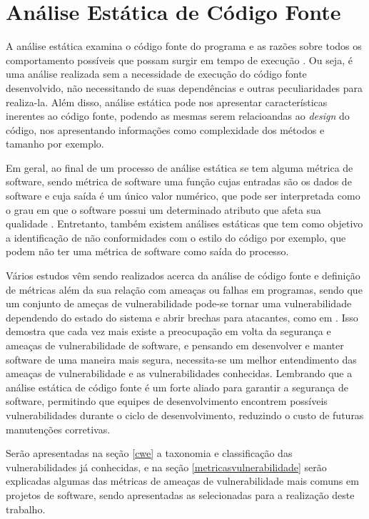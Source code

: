 \chapter{Análise Estática de Código Fonte} \label{chap:analiseestatica}

A análise estática examina o código fonte do programa e as razões sobre todos os
comportamento possíveis que possam surgir em tempo de execução
\cite{ernst:2005}. Ou seja, é uma análise realizada sem a necessidade de
execução do código fonte desenvolvido, não necessitando de suas dependências e
outras peculiaridades para realiza-la. Além disso, análise estática pode nos apresentar
características inerentes ao código fonte, podendo as mesmas serem relacioandas
ao \textit{design} do código, nos apresentando informações como complexidade dos
métodos e tamanho por exemplo.

Em geral, ao final de um processo de análise estática se tem alguma métrica de
software, sendo métrica de software uma função cujas entradas são os dados de
software e cuja saída é um único valor numérico, que pode ser interpretada como
o grau em que o software possui um determinado atributo que afeta sua qualidade
\cite{ieee:1061}. Entretanto, também existem análises estáticas que tem como
objetivo a identificação de não conformidades com o estilo do código por exemplo,
que podem não ter uma métrica de software como saída do processo.

Vários estudos vêm sendo realizados acerca da análise de código fonte e
definição de métricas além da sua relação com ameaças ou falhas em programas,
sendo que um conjunto de ameças de vulnerabilidade pode-se tornar uma
vulnerabilidade dependendo do estado do sistema e abrir brechas para atacantes,
como em .
Isso demostra que cada vez mais existe a preocupação em volta da segurança e
ameaças de vulnerabilidade de software, e pensando em desenvolver e manter
software de uma maneira mais segura, necessita-se um melhor entendimento das
ameaças de vulnerabilidade e as vulnerabilidades conhecidas. Lembrando que a
análise estática de código fonte é um forte aliado para garantir a segurança de
software, permitindo que equipes de desenvolvimento encontrem possíveis
vulnerabilidades durante o ciclo de desenvolvimento, reduzindo o custo de
futuras manutenções corretivas.

Serão apresentadas na seção \ref{cwe} a taxonomia e classificação das
vulnerabilidades já conhecidas, e na seção \ref{metricasvulnerabilidade} serão
explicadas algumas das métricas de ameaças de vulnerabilidade mais comuns em
projetos de software, sendo apresentadas as selecionadas para a realização deste
trabalho.

